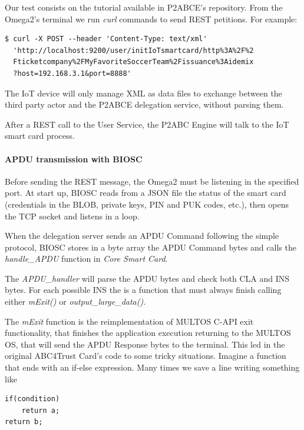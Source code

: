 \hfil

Our test consists on the tutorial available in P2ABCE's repository. From the Omega2's terminal we run \textit{curl} commands to send REST petitions. For example:

\begin{verbatim}
$ curl -X POST --header 'Content-Type: text/xml'
  'http://localhost:9200/user/initIoTsmartcard/http%3A%2F%2
  Fticketcompany%2FMyFavoriteSoccerTeam%2Fissuance%3Aidemix
  ?host=192.168.3.1&port=8888'
\end{verbatim}

The IoT device will only manage XML as data files to exchange between the third party actor and the P2ABCE delegation service, without parsing them.

After a REST call to the User Service, the P2ABC Engine will talk to the IoT smart card process.

\paragraph{APDU transmission with BIOSC}


Before sending the REST message, the Omega2 must be listening in the specified port. At start up, BIOSC reads from a JSON file the status of the smart card (credentials in the BLOB, private keys, PIN and PUK codes, etc.), then opens the TCP socket and listens in a loop.

When the delegation server sends an APDU Command following the simple protocol, BIOSC stores in a byte array the APDU Command bytes and calls the \textit{handle\_APDU} function in \textit{Core Smart Card}.


The \textit{APDU\_handler} will parse the APDU bytes and check both CLA and INS bytes. For each possible INS the is a function that must always finish calling either \textit{mExit()} or \textit{output\_large\_data()}.

The \textit{mExit} function is the reimplementation of MULTOS C-API exit functionality, that finishes the application execution returning to the MULTOS OS, that will send the APDU Response bytes to the terminal. This led in the original ABC4Trust Card's code to some tricky situations. Imagine a function that ends with an if-else expression. Many times we save a line writing something like

\begin{verbatim}
if(condition)
    return a;
return b;
\end{verbatim}

